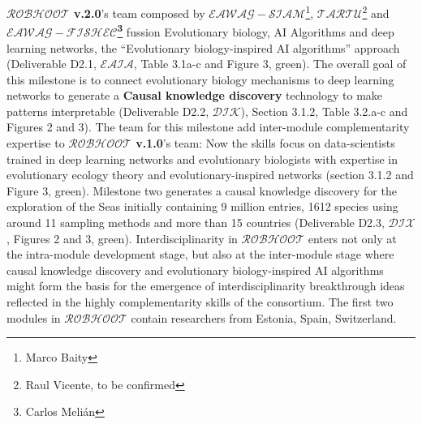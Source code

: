 \documentclass[11pt, a4paper]{article} %
\begin{document}
  {\bf $\mathcal{ROBHOOT}$ v.2.0}'s team composed by {\bf
    $\mathcal{EAWAG-SIAM}$}\footnote{Marco Baity}, {\bf
    $\mathcal{TARTU}$}\footnote{Raul Vicente, to be confirmed} and
  {\bf $\mathcal{EAWAG-FISHEC}$\footnote{Carlos Meli\'an}} fussion
  Evolutionary biology, AI Algorithms and deep learning networks, the
  ``Evolutionary biology-inspired AI algorithms'' approach
  (Deliverable D2.1, {\bf $\mathcal{EAIA}$}, Table 3.1a-c and Figure
  3, green). The overall goal of this milestone is to connect
  evolutionary biology mechanisms to deep learning networks to
  generate a {\bf Causal knowledge discovery} technology to make
  patterns interpretable (Deliverable D2.2, {\bf $\mathcal{DIK}$}),
  Section 3.1.2, Table 3.2.a-c and Figures 2 and 3). The team for this
  milestone add inter-module complementarity expertise to {\bf
    $\mathcal{ROBHOOT}$ v.1.0}'s team: Now the skills focus on
  data-scientists trained in deep learning networks and evolutionary
  biologists with expertise in evolutionary ecology theory and
  evolutionary-inspired networks (section 3.1.2 and Figure 3,
  green). Milestone two generates a causal knowledge discovery for the
  exploration of the Seas initially containing 9 million entries, 1612
  species using around 11 sampling methods and more than 15 countries
  (Deliverable D2.3, {\bf $\mathcal{DIX}$}, Figures 2 and 3,
  green). Interdisciplinarity in $\mathcal{ROBHOOT}$ enters not only
  at the intra-module development stage, but also at the inter-module
  stage where causal knowledge discovery and evolutionary
  biology-inspired AI algorithms might form the basis for the
  emergence of interdisciplinarity breakthrough ideas reflected in the
  highly complementarity skills of the consortium. The first two
  modules in {\bf $\mathcal{ROBHOOT}$} contain researchers from
  Estonia, Spain, Switzerland.
\end{document}

